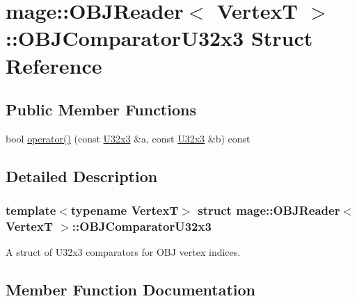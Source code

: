 \hypertarget{structmage_1_1_o_b_j_reader_1_1_o_b_j_comparator_u32x3}{}\section{mage\+:\+:O\+B\+J\+Reader$<$ VertexT $>$\+:\+:O\+B\+J\+Comparator\+U32x3 Struct Reference}
\label{structmage_1_1_o_b_j_reader_1_1_o_b_j_comparator_u32x3}
\subsection*{Public Member Functions}
\begin{DoxyCompactItemize}
\item 
bool \hyperlink{structmage_1_1_o_b_j_reader_1_1_o_b_j_comparator_u32x3_aaf3b4ecab6e0494d8c0e372c24ce5bc7}{operator()} (const \hyperlink{namespacemage_ab3633c193f686845fcf80ce95d18a20b}{U32x3} \&a, const \hyperlink{namespacemage_ab3633c193f686845fcf80ce95d18a20b}{U32x3} \&b) const
\end{DoxyCompactItemize}


\subsection{Detailed Description}
\subsubsection*{template$<$typename VertexT$>$\newline
struct mage\+::\+O\+B\+J\+Reader$<$ Vertex\+T $>$\+::\+O\+B\+J\+Comparator\+U32x3}

A struct of {\ttfamily U32x3} comparators for O\+BJ vertex indices. 

\subsection{Member Function Documentation}
\hypertarget{structmage_1_1_o_b_j_reader_1_1_o_b_j_comparator_u32x3_aaf3b4ecab6e0494d8c0e372c24ce5bc7}{}\label{structmage_1_1_o_b_j_reader_1_1_o_b_j_comparator_u32x3_aaf3b4ecab6e0494d8c0e372c24ce5bc7} 
